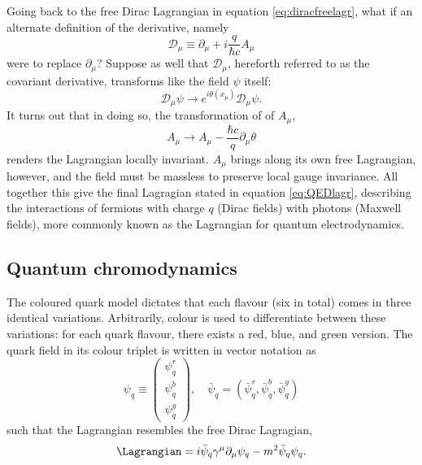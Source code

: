 Going back to the free Dirac Lagrangian in equation \ref{eq:diracfreelagr}, what if an alternate definition of the derivative, namely 
\begin{equation}
    \mathcal{D}_{\mu}\equiv \partial_{\mu}+i\dfrac{q}{\hbar c}A_{\mu}
\end{equation}
were to replace $\partial_{\mu}$? Suppose as well that $\mathcal{D}_{\mu}$, hereforth referred to as the covariant derivative, transforms like the field $\psi$ itself:
\begin{equation}
    \mathcal{D}_{\mu}\psi\rightarrow e^{i\theta(x_{\mu})}\mathcal{D}_{\mu}\psi .
\end{equation}
It turns out that in doing so, the transformation of of $A_{\mu}$, 
\begin{equation}
    A_{\mu}\rightarrow A_{\mu}-\dfrac{\hbar c}{q}\partial_{\mu}\theta
\end{equation}
renders the Lagrangian locally invariant. $A_{\mu}$ brings along its own free Lagrangian, however, and the field must be massless to preserve local gauge invariance. All together this give the final Lagragian stated in equation \ref{eq:QEDlagr}, describing the interactions of fermions with charge $q$ (Dirac fields) with photons (Maxwell fields), more commonly known as the Lagrangian for quantum electrodynamics. 

\subsection{Quantum chromodynamics}

The coloured quark model dictates that each flavour (six in total) comes in three identical variations. Arbitrarily, colour is used to differentiate between these variations: for each quark flavour, there exists a red, blue, and green version. The quark field in its colour triplet is written in vector notation as
\begin{equation}
\psi_q\equiv
    \begin{pmatrix} 
        \psi_q^r\\ 
        \psi_q^b\\
        \psi_q^g
    \end{pmatrix}
,\quad
\bar{\psi}_q=(\bar{\psi}_q^r,\bar{\psi}_q^b,\bar{\psi}_q^g)
\end{equation}
such that the Lagrangian resembles the free Dirac Lagragian,
\begin{equation} \label{eq:QCDfreelagr}
    \Lagrangian=i\bar{\psi}_q\gamma^{\mu}\partial_{\mu}\psi_q-m^2\bar{\psi}_q \psi_q.
\end{equation}

